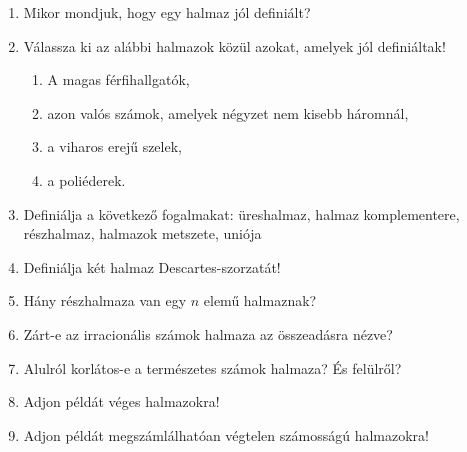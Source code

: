 \vfill
\begin{questions}[sec-01-05]
  \begin{enumerate}
    \item Mikor mondjuk, hogy egy halmaz jól definiált?

    \item Válassza ki az alábbi halmazok közül azokat, amelyek jól definiáltak!
          \begin{enumerate}
            \item A magas férfihallgatók,
            \item azon valós számok, amelyek négyzet nem kisebb háromnál,
            \item a viharos erejű szelek,
            \item a poliéderek.
          \end{enumerate}

    \item Definiálja a következő fogalmakat: üreshalmaz, halmaz komplementere,
          részhalmaz, halmazok metszete, uniója

    \item Definiálja két halmaz Descartes-szorzatát!

    \item Hány részhalmaza van egy $n$ elemű halmaznak?

    \item Zárt-e az irracionális számok halmaza az összeadásra nézve?

    \item Alulról korlátos-e a természetes számok halmaza? És felülről?

    \item Adjon példát véges halmazokra!

    \item Adjon példát megszámlálhatóan végtelen számosságú halmazokra!
  \end{enumerate}
\end{questions}